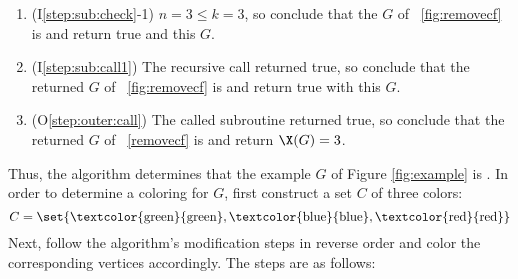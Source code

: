 \begin{enumerate}
\item (I\ref{step:sub:check}-1) \(n=3\le k=3\), so conclude that the \(G\) of \figurename~\ref{fig:removecf} is
   and return true and this \(G\).

\item (I\ref{step:sub:call1}) The recursive call returned true, so conclude that the returned \(G\) of
  \figurename~\ref{fig:removecf} is  and return true with this \(G\).

\item (O\ref{step:outer:call}) The called subroutine returned true, so conclude that the returned \(G\) of
  \figurename~\ref{removecf} is  and return \(\X(G)=3\).

\end{enumerate}

Thus, the algorithm determines that the example \(G\) of Figure \ref{fig:example} is .  In order to
determine a  coloring for \(G\), first construct a set \(C\) of three colors:
\[C=\set{\text{\textcolor{green}{green}},\text{\textcolor{blue}{blue}},\text{\textcolor{red}{red}}}\]
Next, follow the algorithm's modification steps in reverse order and color the corresponding vertices accordingly.
The steps are as follows:

